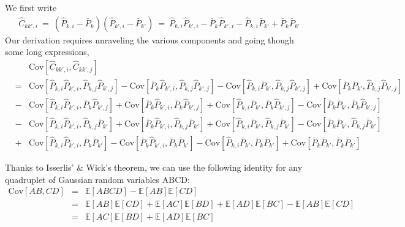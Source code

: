 \documentclass{aastex6}
\newcommand{\eqn}[1]{\begin{eqnarray}#1\end{eqnarray}}
\begin{document}
We first write
\eqn{
	\hat{C}_{kk',i} \ = \ (\hat{P}_{k, i} - \bar{P}_{k})(\hat{P}_{k', i} - \bar{P}_{k'}) 
	\ = \  \hat{P}_{k, i}\hat{P}_{k', i} - \bar{P}_{k}\hat{P}_{k', i} - \hat{P}_{k, i}\bar{P}_{k'}  + \bar{P}_{k}\bar{P}_{k'}
} 
Our derivation requires unraveling the various components and going though some long expressions,
\eqn{
	 && \mathrm{Cov}[\hat{C}_{kk',i} , \hat{C}_{kk',j} ] \\
	 &=& 
	  \mathrm{Cov}[\hat{P}_{k, i}\hat{P}_{k', i}, \hat{P}_{k, j}\hat{P}_{k', j} ] - \mathrm{Cov}[ \bar{P}_{k}\hat{P}_{k', i}, \hat{P}_{k, j}\hat{P}_{k', j} ] - \mathrm{Cov}[ \hat{P}_{k, i}\bar{P}_{k'} ,\hat{P}_{k, j}\hat{P}_{k', j} ] + \mathrm{Cov}[\bar{P}_{k}\bar{P}_{k'}, \hat{P}_{k, j}\hat{P}_{k', j} ]	\\
	 &-& \mathrm{Cov}[\hat{P}_{k, i}\hat{P}_{k', i} ,\bar{P}_{k}\hat{P}_{k', j} ] + \mathrm{Cov}[ \bar{P}_{k}\hat{P}_{k', i}, \bar{P}_{k}\hat{P}_{k', j} ] + \mathrm{Cov}[\hat{P}_{k, i}\bar{P}_{k'}, \bar{P}_{k}\hat{P}_{k', j} ] - \mathrm{Cov}[\bar{P}_{k}\bar{P}_{k'}, \bar{P}_{k}\hat{P}_{k', j} ]\\
	 &-& \mathrm{Cov}[\hat{P}_{k, i}\hat{P}_{k', i}, \hat{P}_{k, j}\bar{P}_{k'}] + \mathrm{Cov}[ \bar{P}_{k}\hat{P}_{k', i} ,\hat{P}_{k, j}\bar{P}_{k'}] + \mathrm{Cov}[\hat{P}_{k, i}\bar{P}_{k'} ,\hat{P}_{k, j}\bar{P}_{k'}] -\mathrm{Cov}[\bar{P}_{k}\bar{P}_{k'}, \hat{P}_{k, j}\bar{P}_{k'}]\\
	&+&  \mathrm{Cov}[\hat{P}_{k, i}\hat{P}_{k', i}, \bar{P}_{k}\bar{P}_{k'}] - \mathrm{Cov}[ \bar{P}_{k}\hat{P}_{k', i} , \bar{P}_{k}\bar{P}_{k'} ] - \mathrm{Cov}[\hat{P}_{k, i}\bar{P}_{k'} , \bar{P}_{k}\bar{P}_{k'}] + \mathrm{Cov}[\bar{P}_{k}\bar{P}_{k'} , \bar{P}_{k}\bar{P}_{k'}]
}


Thanks to Isserlis' \& Wick's theorem, we can use the following identity for any quadruplet of Gaussian random variables ABCD: 
\eqn{
	\mathrm{Cov}[AB,CD] &=& \mathbb{E}[ABCD] - \mathbb{E}[AB]\mathbb{E}[CD] \\
	&=& \mathbb{E}[AB]\mathbb{E}[CD] + \mathbb{E}[AC]\mathbb{E}[BD] + \mathbb{E}[AD]\mathbb{E}[BC] - \mathbb{E}[AB]\mathbb{E}[CD] \\
	&=& \mathbb{E}[AC]\mathbb{E}[BD] + \mathbb{E}[AD]\mathbb{E}[BC] \label{eq:wickstheorem}
}
\end{document}
